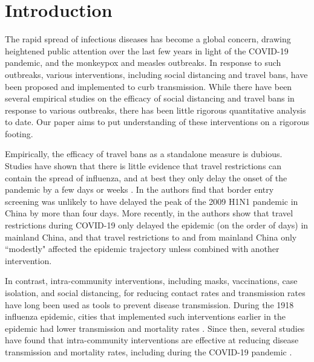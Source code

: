 \documentclass[11pt]{article}
\begin{document}
\maketitle

\section{Introduction}

The rapid spread of infectious diseases has become a global concern, drawing heightened public attention over the last few years in light of the COVID-19 pandemic, and the monkeypox and measles outbreaks. In response to such outbreaks, various interventions, including social distancing and travel bans, have been proposed and implemented to curb transmission. While there have been several empirical studies on the efficacy of social distancing and travel bans in response to various outbreaks, there has been little rigorous quantitative analysis to date. Our paper aims to put understanding of these interventions on a rigorous footing.


Empirically, the efficacy of travel bans as a standalone measure is dubious. Studies have shown that there is little evidence that travel restrictions can contain the spread of influenza, and at best they only delay the onset of the pandemic by a few days or weeks \cite{ferguson2006strategies, mateus2014effectiveness}. In \cite{yu2012transmission} the authors find that border entry screening was unlikely to have delayed the peak of the 2009 H1N1 pandemic in China by more than four days. More recently, in \cite{chinazzi2020effect} the authors show that travel restrictions during COVID-19 only delayed the epidemic (on the order of days) in mainland China, and that travel restrictions to and from mainland China only ``modestly" affected the epidemic trajectory unless combined with another intervention.

In contrast, intra-community interventions, including masks, vaccinations, case isolation, and social distancing, for reducing contact rates and transmission rates have long been used as tools to prevent disease transmission. During the 1918 influenza epidemic, cities that implemented such interventions earlier in the epidemic had lower transmission and mortality rates \cite{bootsma2007effect}. Since then, several studies have found that intra-community interventions are effective at reducing disease transmission and mortality rates, including during the COVID-19 pandemic \cite{ferguson2006strategies, kwon2021association, haug2020ranking}.
\end{document}
